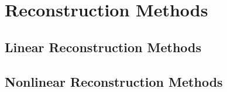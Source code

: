 \section{Reconstruction Methods}
\subsection{Linear Reconstruction Methods}
\subsection{Nonlinear Reconstruction Methods}
